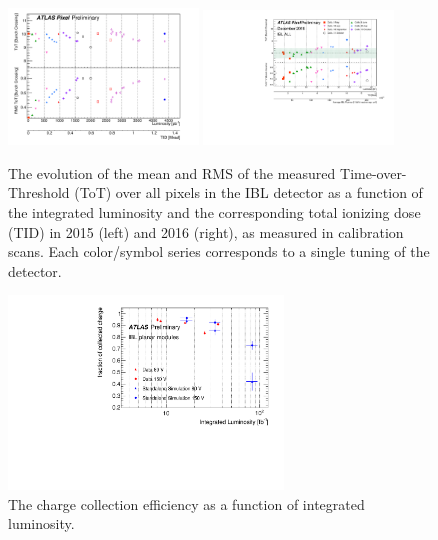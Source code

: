 \begin{figure}[!htpb]
\centering
\includegraphics[width=0.45\textwidth]{2015Calibration.pdf}
\includegraphics[width=0.45\textwidth]{2016Calibration.pdf}
\caption{The evolution of the mean and RMS of the measured Time-over-Threshold (ToT) over all pixels in the IBL detector as a function of the integrated luminosity and the corresponding total ionizing dose (TID) in 2015 (left) and 2016 (right), as measured in calibration scans. Each color/symbol series corresponds to a single tuning of the detector. }
\label{fig:ToTCalibrationDrift}
\end{figure}


\begin{figure}[htpb!]
\centering
\includegraphics[width=0.65\textwidth]{CCE_Run2_approved.pdf}
\caption{The charge collection efficiency as a function of integrated luminosity.}
\label{fig:CCE:Run2}
\end{figure}



